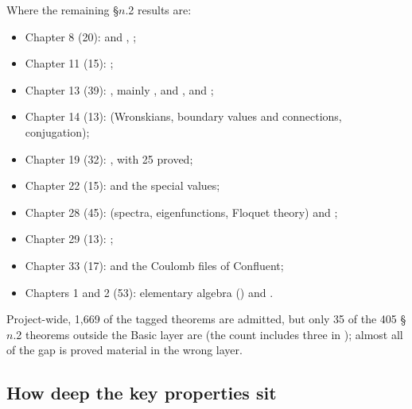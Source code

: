 \documentclass[11pt,a4paper]{article}
\begin{document}
Where the remaining \S\(n\).2 results are:
\begin{RaggedRight}
\begin{itemize}
  \item Chapter 8 (20):  and
    , ;
  \item Chapter 11 (15): ;
  \item Chapter 13 (39): , mainly
    ,  and
    , and ;
  \item Chapter 14 (13):  (Wronskians, boundary values and
    connections, conjugation);
  \item Chapter 19 (32): , with 25 proved;
  \item Chapter 22 (15):  and the special
    values;
  \item Chapter 28 (45):  (spectra, eigenfunctions, Floquet
    theory) and ;
  \item Chapter 29 (13): ;
  \item Chapter 33 (17):  and the Coulomb files of
    Confluent;
  \item Chapters 1 and 2 (53): elementary algebra () and
    .
\end{itemize}
\end{RaggedRight}
Project-wide, 1{,}669 of the tagged theorems are admitted, but only 35 of the 405 \S\(n\).2
theorems outside the Basic layer are (the count includes three in ); almost all of the gap is proved material in the wrong layer.

\subsection{How deep the key properties sit}
\end{document}
